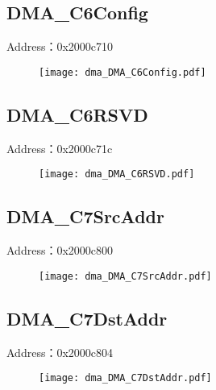 \subsection{DMA\_C6Config}
\label{dma-DMA-C6Config}
Address：0x2000c710
 \begin{figure}[H]
\texttt{[image: dma\_DMA\_C6Config.pdf]}
\end{figure}

\subsection{DMA\_C6RSVD}
\label{dma-DMA-C6RSVD}
Address：0x2000c71c
 \begin{figure}[H]
\texttt{[image: dma\_DMA\_C6RSVD.pdf]}
\end{figure}

\subsection{DMA\_C7SrcAddr}
\label{dma-DMA-C7SrcAddr}
Address：0x2000c800
 \begin{figure}[H]
\texttt{[image: dma\_DMA\_C7SrcAddr.pdf]}
\end{figure}

\subsection{DMA\_C7DstAddr}
\label{dma-DMA-C7DstAddr}
Address：0x2000c804
 \begin{figure}[H]
\texttt{[image: dma\_DMA\_C7DstAddr.pdf]}
\end{figure}

